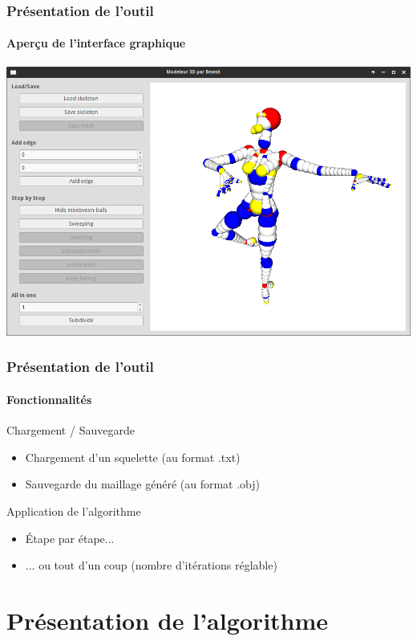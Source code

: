 \documentclass[9pt]{beamer}
\begin{document}
\begin{frame}
	\frametitle{Présentation de l'outil}
	\framesubtitle{Aperçu de l'interface graphique}
	\begin{center}
		\includegraphics[scale=0.27]{images/screenshot.png}
	\end{center}
\end{frame}

\begin{frame}
	\frametitle{Présentation de l'outil}
	\framesubtitle{Fonctionnalités}
	\begin{block}{Chargement / Sauvegarde}
		\begin{itemize}
			\item Chargement d'un squelette (au format .txt)
			\item Sauvegarde du maillage généré (au format .obj)
		\end{itemize}				
	\end{block}
	\begin{block}{Application de l'algorithme}
		\begin{itemize}
			\item Étape par étape...
			\item ... ou tout d'un coup (nombre d'itérations réglable)
		\end{itemize}
	\end{block}
\end{frame}



\section{Présentation de l'algorithme}
\end{document}

